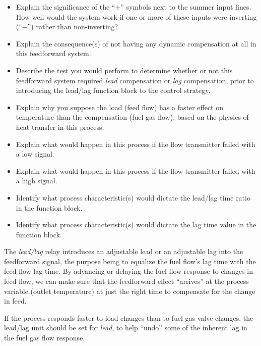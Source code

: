 \begin{itemize}
\item{} Explain the significance of the ``+'' symbols next to the summer input lines.  How well would the system work if one or more of these inputs were inverting (``$-$'') rather than non-inverting?
\item{} Explain the consequence(s) of not having any dynamic compensation at all in this feedforward system.
\item{} Describe the test you would perform to determine whether or not this feedforward system required {\it lead} compensation or {\it lag} compensation, prior to introducing the lead/lag function block to the control strategy.
\item{} Explain why you suppose the load (feed flow) has a faster effect on temperature than the compensation (fuel gas flow), based on the physics of heat transfer in this process.
\item{} Explain what would happen in this process if the flow transmitter failed with a low signal.
\item{} Explain what would happen in this process if the flow transmitter failed with a high signal.
\item{} Identify what process characteristic(s) would dictate the lead/lag time ratio in the function block.
\item{} Identify what process characteristic(s) would dictate the lag time value in the function block.
\end{itemize}







The {\it lead/lag} relay introduces an adjustable lead or an adjustable lag into the feedforward signal, the purpose being to equalize the fuel flow's lag time with the feed flow lag time.  By advancing or delaying the fuel flow response to changes in feed flow, we can make sure that the feedforward effect ``arrives'' at the process variable (outlet temperature) at just the right time to compensate for the change in feed.







If the process responds faster to load changes than to fuel gas valve changes, the lead/lag unit should be set for {\it lead}, to help ``undo'' some of the inherent lag in the fuel gas flow response.




